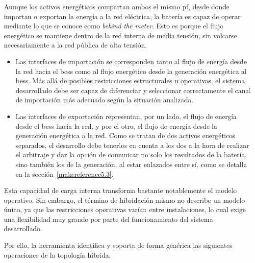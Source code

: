 Aunque los activos energéticos compartan ambos el mismo \gls{pf}, desde donde importan o exportan la energía a la red eléctrica, la batería es capaz de operar mediante lo que se conoce como \textit{behind the meter}. Esto es porque el flujo energético se mantiene dentro de la red interna de media tensión, sin volcarse necesariamente a la red pública de alta tensión.

\begin{itemize}

  \item Las interfaces de importación se corresponden tanto al flujo de energía desde la red hacia el \gls{bess} como al flujo energético desde la generación energética al \gls{bess}. Más allá de posibles restricciones estructurales u operativas, el sistema desarrollado debe ser capaz de diferenciar y seleccionar correctamente el canal de importación más adecuado según la situación analizada.

  \item Las interfaces de exportación representan, por un lado, el flujo de energía desde el \gls{bess} hacia la red, y por el otro, el flujo de energía desde la generación energética a la red. Como se tratan de dos activos energéticos separados, el desarrollo debe tenerlos en cuenta a los dos a la hora de realizar el arbitraje y dar la opción de comunicar no solo los resultados de la batería, sino también los de la generación, al estar enlazados entre sí, como se detalla en la sección~\ref{makereference5.3}.

\end{itemize}

Esta capacidad de carga interna transforma bastante notablemente el modelo operativo. Sin embargo, el término de hibridación mismo no describe un modelo único, ya que las restricciones operativas varían entre instalaciones, lo cual exige una flexibilidad muy grande por parte del funcionamiento del sistema desarrollado.

Por ello, la herramienta identifica y soporta de forma genérica las siguientes operaciones de la topología híbrida.

